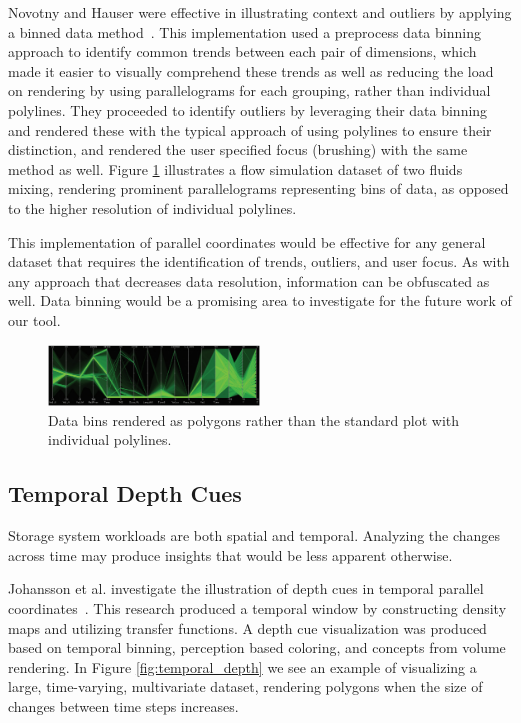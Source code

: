 \documentclass[journal]{vgtc}                %
\begin{document}
Novotny and Hauser were effective in illustrating context and outliers by applying a binned data method~\cite{novotny:2006:OPFC}. This implementation used a preprocess data binning approach to identify common trends between each pair of dimensions, which made it easier to visually comprehend these trends as well as reducing the load on rendering by using parallelograms for each grouping, rather than individual polylines. They proceeded to identify outliers by leveraging their data binning and rendered these with the typical approach of using polylines to ensure their distinction, and rendered the user specified focus (brushing) with the same method as well. Figure \ref{fig:data_binning} illustrates a flow simulation dataset of two fluids mixing, rendering prominent parallelograms representing bins of data, as opposed to the higher resolution of individual polylines.

This implementation of parallel coordinates would be effective for any general dataset that requires the identification of trends, outliers, and user focus. As with any approach that decreases data resolution, information can be obfuscated as well. Data binning would be a promising area to investigate for the future work of our tool.

\begin{figure}[h!]
 \centering
 \includegraphics[width=0.5\textwidth]{images/data_binning.eps}
 \caption[Data bins rendered as polygons rather than individual polylines.]{Data bins rendered as polygons rather than the standard plot with individual polylines.}
 \label{fig:data_binning}
\end{figure}

\subsection{Temporal Depth Cues}
\label{temporal_depth_cues}

Storage system workloads are both spatial and temporal. Analyzing the changes across time may produce insights that would be less apparent otherwise.

Johansson et al. investigate the illustration of depth cues in temporal parallel coordinates~\cite{johansson:2007:DCDTPC}. This research produced a temporal window by constructing density maps and utilizing transfer functions. A depth cue visualization was produced based on temporal binning, perception based coloring, and concepts from volume rendering. In Figure \ref{fig:temporal_depth} we see an example of visualizing a large, time-varying, multivariate dataset, rendering polygons when the size of changes between time steps increases.
\end{document}
